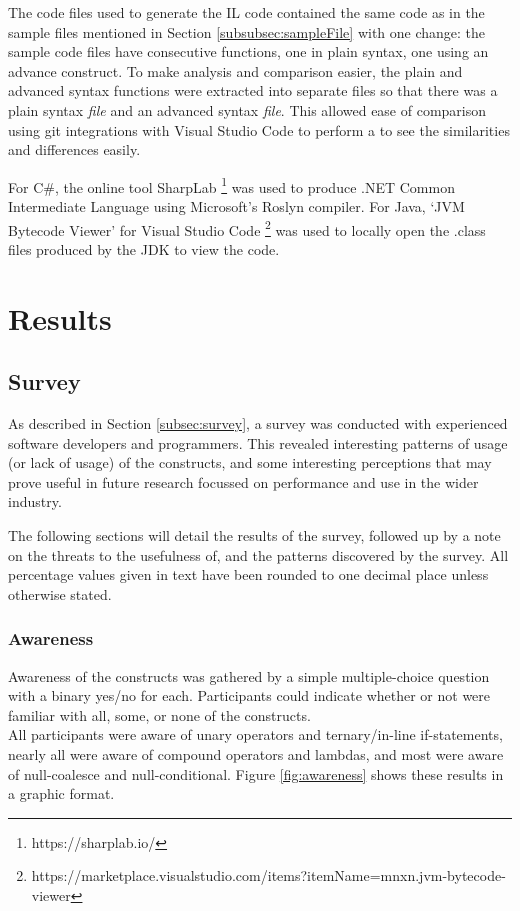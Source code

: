\documentclass{article}
\begin{document}
        The code files used to generate the IL code contained the same code as in the sample files mentioned in Section \ref{subsubsec:sampleFile} with one change: the sample code files have consecutive functions, one in plain syntax, one using an advance construct. To make analysis and comparison easier, the plain and advanced syntax functions were extracted into separate files so that there was a plain syntax \emph{file} and an advanced syntax \emph{file}. This allowed ease of comparison using git integrations with Visual Studio Code to perform a  to see the similarities and differences easily. 

        For C\#, the online tool SharpLab \footnote{https://sharplab.io/} was used to produce .NET Common Intermediate Language using Microsoft's Roslyn  compiler. For Java, `JVM Bytecode Viewer' for Visual Studio Code \footnote{https://marketplace.visualstudio.com/items?itemName=mnxn.jvm-bytecode-viewer} was used to locally open the .class files produced by the JDK to view the code.

\newpage
\section{Results}
    \subsection{Survey}
    \label{subsec:results}
        As described in Section \ref{subsec:survey}, a survey was conducted with experienced software developers and programmers. This revealed interesting patterns of usage (or lack of usage) of the constructs, and some interesting perceptions that may prove useful in future research focussed on performance and use in the wider industry.

        The following sections will detail the results of the survey, followed up by a note on the threats to the usefulness of, and the patterns discovered by the survey. All percentage values given in text have been rounded to one decimal place unless otherwise stated.

        \subsubsection{Awareness}
            Awareness of the constructs was gathered by a simple multiple-choice question with a binary yes/no for each. Participants could indicate whether or not were familiar with all, some, or none of the constructs.
            \\\newline
            All participants were aware of unary operators and ternary/in-line if-statements, nearly all were aware of compound operators and lambdas, and most were aware of null-coalesce and null-conditional. Figure \ref{fig:awareness} shows these results in a graphic format.
\end{document}
